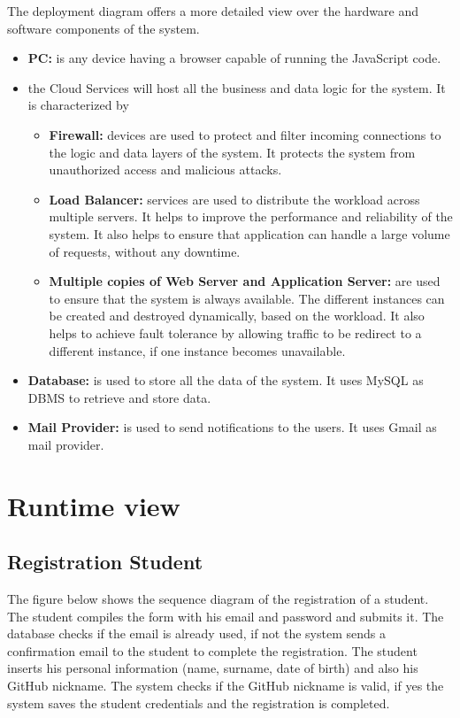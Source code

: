 The deployment diagram offers a more detailed view over the hardware and software components of the system. 
\begin{itemize}
    \item  \textbf{PC: }is any device having a browser capable of running the JavaScript code.
    \item   the Cloud Services will host all the business and data logic for the system. It is characterized by 
    \begin{itemize}
        \item  \textbf{Firewall:} devices are used to protect and filter incoming connections to the logic and data layers of the system. It protects the system from unauthorized access and malicious attacks.
        \item  \textbf{Load Balancer:} services are used to distribute the workload across multiple servers. It helps to improve the performance and reliability of the system. It also helps to ensure that application can handle a large volume of requests, without any downtime.
        \item  \textbf{Multiple copies of Web Server and Application Server:} are used to ensure that the system is always available. The different instances can be created and destroyed dynamically, based on the workload. It also helps to achieve fault tolerance by allowing traffic to be redirect to a different instance, if one instance becomes unavailable.
    \end{itemize}
    \item   \textbf{Database:} is used to store all the data of the system. It uses MySQL as DBMS to retrieve and store data.
    \item   \textbf{Mail Provider: }is used to send notifications to the users. It uses Gmail as mail provider.
\end{itemize}

\section{Runtime view}
\subsection{Registration Student}
The figure below shows the sequence diagram of the registration of a student. The student compiles the form with his email and password and submits it. 
The database checks if the email is already used, if not the system sends a confirmation email to the student to complete the registration. 
The student inserts his personal information (name, surname, date of birth) and also his GitHub nickname. 
The system checks if the GitHub nickname is valid, if yes the system saves the student credentials and the registration is completed.

